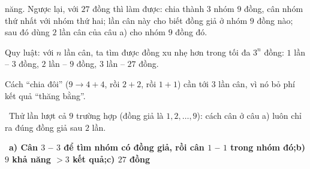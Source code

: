 \documentclass[11pt]{article}
\providecommand{\AnsWord}{Đáp số}
\newcommand{\ans}[1]{\par\smallskip{\bfseries\color{tmGreen!88!black}\AnsWord:}\ {\bfseries\color{AnsRed}#1}\par}
\newcommand{\verify}[1]{\par\smallskip\noindent{\bfseries\color{tmGreen!80!black}\faCheckCircle\ \CheckWord}\ #1\par}
\def\AnsWord{Đáp số}
\def\CheckWord{Thử lại:}
\begin{document}
{năng. Ngược lại, với $27$ đồng thì làm được: chia thành $3$ nhóm $9$ đồng, cân nhóm thứ nhất với nhóm thứ hai; lần cân này cho biết
đồng giả ở nhóm $9$ đồng nào; sau đó dùng $2$ lần cân của câu a) cho nhóm $9$ đồng đó.
\begin{tipbox}Quy luật: với $n$ lần cân, ta tìm được đồng xu nhẹ hơn trong tối đa $3^n$ đồng: $1$ lần -- $3$ đồng, $2$ lần -- $9$
đồng, $3$ lần -- $27$ đồng.\end{tipbox}
\begin{warnbox}Cách ``chia đôi'' ($9 \to 4 + 4$, rồi $2 + 2$, rồi $1 + 1$) cần tới $3$ lần cân, vì nó bỏ phí kết quả ``thăng
bằng''.\end{warnbox}
\verify{Thử lần lượt cả $9$ trường hợp (đồng giả là $1, 2, \dots, 9$): cách cân ở câu a) luôn chỉ ra đúng đồng giả sau $2$ lần.}
\ans{a) Cân $3$ -- $3$ để tìm nhóm có đồng giả, rồi cân $1$ -- $1$ trong nhóm đó;\quad b) $9$ khả năng $> 3$ kết quả;\quad c) $27$ đồng}
}

\end{document}
